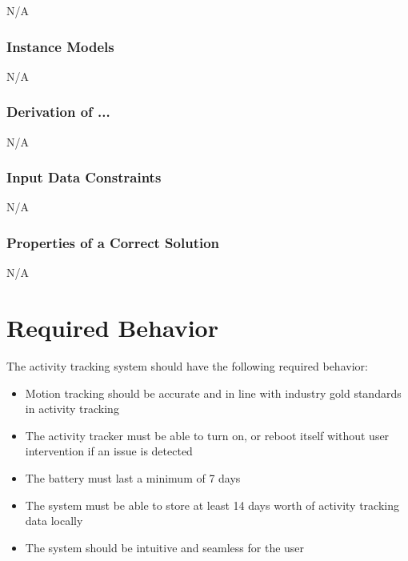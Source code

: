 \documentclass[12pt]{article}
\begin{document}
N/A



\subsubsection{Instance Models} \label{sec_instance}
N/A

\subsubsection*{Derivation of ...}
N/A

\subsubsection{Input Data Constraints} \label{sec_DataConstraints}
N/A


\subsubsection{Properties of a Correct Solution} \label{sec_CorrectSolution}
N/A


\section{Required Behavior}

The activity tracking system should have the following required behavior: \\

\begin{itemize}
\item Motion tracking should be accurate and in line with industry gold standards in activity tracking\\
\item The activity tracker must be able to turn on, or reboot itself without user intervention if an issue is detected\\
\item The battery must last a minimum of 7 days\\
\item The system must be able to store at least 14 days worth of activity tracking data locally\\
\item The system should be intuitive and seamless for the user\\
\end{itemize} 
\end{document}
